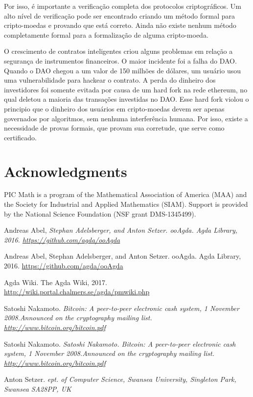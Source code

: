 \documentclass[12pt]{report}
\begin{document}
Por isso, é importante a verificação completa dos protocolos criptográficos. Um alto nível de verificação pode ser encontrado criando um método formal para cripto-moedas e provando que está correto. Ainda não existe nenhum método completamente formal para a formalização de alguma cripto-moeda.

O crescimento de contratos inteligentes criou alguns problemas em relação a segurança de instrumentos financeiros. O maior incidente foi a falha do DAO. Quando o DAO chegou a um valor de 150 milhões de dólares, um usuário usou uma vulnerabilidade para hackear o contrato. A perda do dinheiro dos investidores foi somente evitada por causa de um hard fork na rede ethereum, no qual deletou a maioria das transações investidas no DAO. Esse hard fork violou o principio que o dinheiro dos usuários em cripto-moedas devem ser apenas governados por algoritmos, sem nenhuma interferência humana. Por isso, existe a necessidade de provas formais, que provam sua corretude, que serve como certificado.

\newpage
\section{Acknowledgments}

 PIC Math is a program of the Mathematical Association of America (MAA) and the Society for Industrial and Applied Mathematics (SIAM). Support is provided by the National Science Foundation (NSF grant DMS-1345499).
\newpage
 
\begin{thebibliography}{111}

    Andreas Abel, 
    {\it Stephan Adelsberger, and Anton Setzer. ooAgda. Agda Library, 2016. 
    \url{https://github.com/agda/ooAgda}}
    
    Andreas Abel, Stephan Adelsberger, and Anton Setzer. ooAgda. Agda Library, 2016. 
    \url{https://github.com/agda/ooAgda}

    Agda Wiki.  The Agda Wiki, 2017.  
    \url{http://wiki.portal.chalmers.se/agda/pmwiki.php}
    
    Satoshi Nakamoto.  
    {\it Bitcoin:  A peer-to-peer electronic cash system, 1 November 2008.Announced on the cryptography mailing list. \url{http://www.bitcoin.org/bitcoin.pdf}}

    Satoshi Nakamoto.  
    {\it Satoshi Nakamoto.  Bitcoin:  A peer-to-peer electronic cash system, 1 November 2008.Announced on the cryptography mailing list. \url{http://www.bitcoin.org/bitcoin.pdf}}

    Anton Setzer.  
    {\it ept. of Computer Science, Swansea University, Singleton Park, Swansea SA28PP, UK}

\end{thebibliography}
\end{document}
